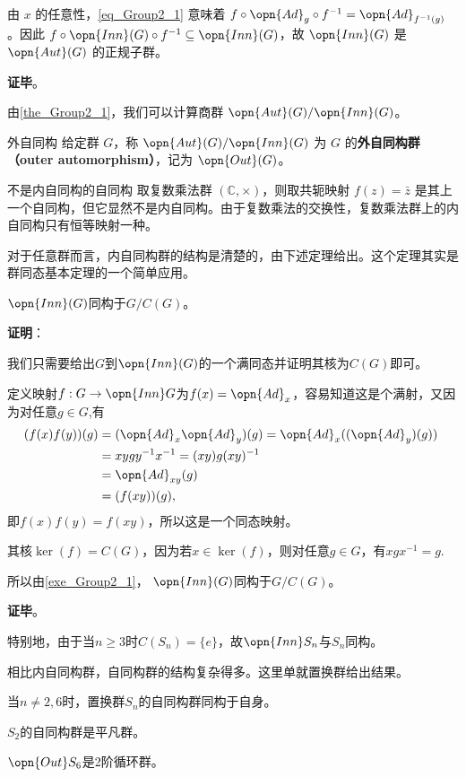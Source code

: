 由 $x$ 的任意性，\autoref{eq_Group2_1} 意味着 $f\circ \opn{Ad}_g\circ f^{-1}=\opn{Ad}_{f^{-1}(g)}$。因此 $f\circ\opn{Inn}(G)\circ f^{-1}\subseteq\opn{Inn}(G)$，故 $\opn{Inn}(G)$ 是 $\opn{Aut}(G)$ 的正规子群。

\textbf{证毕}。

由\autoref{the_Group2_1}，我们可以计算商群 $\opn{Aut}(G)/\opn{Inn}(G)$。

\begin{definition}{外自同构}
给定群 $G$，称 $\opn{Aut}(G)/\opn{Inn}(G)$ 为 $G$ 的\textbf{外自同构群（outer automorphism）}，记为 $\opn{Out} (G)$。
\end{definition}

\begin{example}{不是内自同构的自同构}
取复数乘法群 $(\mathbb{C}, \times)$，则取共轭映射 $f(z)=\bar{z}$ 是其上一个自同构，但它显然不是内自同构。由于复数乘法的交换性，复数乘法群上的内自同构只有恒等映射一种。
\end{example}

对于任意群而言，内自同构群的结构是清楚的，由下述定理给出。这个定理其实是群同态基本定理的一个简单应用。

\begin{theorem}{}\label{the_Group2_2}
$\opn{Inn}(G)$同构于$G/C(G)$。
\end{theorem}

\textbf{证明}：

我们只需要给出$G$到$\opn{Inn}(G)$的一个满同态并证明其核为$C(G)$即可。

定义映射$f:G\to \opn{Inn} G$为$f(x)=\opn{Ad}_x$，容易知道这是个满射，又因为对任意$g\in G$,有
\begin{equation}
\begin{split}
(f(x)f(y))(g)&=(\opn{Ad}_x\opn{Ad}_y)(g)=\opn{Ad}_x((\opn{Ad}_y)(g))\\
&=xygy^{-1}x^{-1}=(xy)g(xy)^{-1}\\
&=\opn{Ad}_{xy}(g)\\
&=(f(xy))(g),
\end{split}~
\end{equation}
即$f(x)f(y)=f(xy)$，所以这是一个同态映射。

其核$\ker(f)=C(G)$，因为若$x\in\ker(f)$，则对任意$g\in G$，有$xgx^{-1}=g$.

所以由\autoref{exe_Group2_1}， $\opn{Inn}(G)$同构于$G/C(G)$。

\textbf{证毕}。

特别地，由于当$n\geq 3$时$C(S_n)=\{e\}$，故$\opn{Inn} S_n$与$S_n$同构。

相比内自同构群，自同构群的结构复杂得多。这里单就置换群给出结果。

\begin{theorem}{}
当$n\neq 2,6$时，置换群$S_n$的自同构群同构于自身。

$S_2$的自同构群是平凡群。

$\opn{Out} S_6$是2阶循环群。
\end{theorem}
